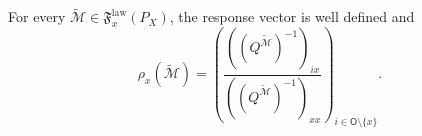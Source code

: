For every \(\widetilde{\mathcal M}\in\mathfrak F_x^{\mathrm{law}}(P_X)\), the response vector is well defined and
\[
 \rho_x(\widetilde{\mathcal M})
 =\left(
 \frac{((Q^{\widetilde{\mathcal M}})^{-1})_{ix}}
 {((Q^{\widetilde{\mathcal M}})^{-1})_{xx}}
 \right)_{i\in\mathsf O\setminus\{x\}}.
\]